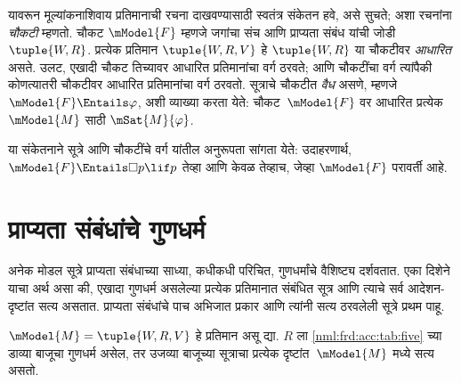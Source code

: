 यावरून मूल्यांकनाशिवाय प्रतिमानाची रचना दाखवण्यासाठी
स्वतंत्र संकेतन हवे, असे सुचते; अशा रचनांना \emph{चौकटी}
म्हणतो. चौकट $\mModel{F}$ म्हणजे जगांचा संच आणि
प्राप्यता संबंध यांची जोडी $\tuple{W, R}$.
प्रत्येक प्रतिमान $\tuple{W, R, V}$ हे $\tuple{W, R}$
या चौकटीवर \emph{आधारित} असते. उलट, एखादी चौकट
तिच्यावर आधारित प्रतिमानांचा वर्ग ठरवते; आणि चौकटींचा
वर्ग त्यांपैकी कोणत्यातरी चौकटीवर आधारित प्रतिमानांचा
वर्ग ठरवतो. सूत्राचे चौकटीत \emph{वैध} असणे,
म्हणजे $\mModel{F} \Entails \varphi$, अशी व्याख्या करता येते:
चौकट~$\mModel{F}$ वर आधारित प्रत्येक $\mModel{M}$
साठी $\mSat{M}{\varphi}$.

या संकेतनाने सूत्रे आणि चौकटींचे वर्ग यांतील
अनुरूपता सांगता येते: उदाहरणार्थ,
$\mModel{F} \Entails \Box p \lif p$ तेव्हा आणि केवळ
तेव्हाच, जेव्हा $\mModel{F}$ परावर्ती आहे.













\section{प्राप्यता संबंधांचे गुणधर्म}\label{nml:frd:acc:sec}

अनेक मोडल सूत्रे प्राप्यता संबंधाच्या साध्या, कधीकधी
परिचित, गुणधर्मांचे वैशिष्ट्य दर्शवतात. एका दिशेने याचा
अर्थ असा की, एखादा गुणधर्म असलेल्या प्रत्येक प्रतिमानात
संबंधित सूत्र आणि त्याचे सर्व आदेशन-दृष्टांत सत्य
असतात. प्राप्यता संबंधांचे पाच अभिजात प्रकार आणि त्यांनी
सत्य ठरवलेली सूत्रे प्रथम पाहू.

\begin{thm}\label{nml:frd:acc:thm:soundschemas}
  $\mModel{M} = \tuple{W, R, V}$ हे प्रतिमान असू द्या.
  $R$ ला \ref{nml:frd:acc:tab:five} च्या डाव्या बाजूचा गुणधर्म
  असेल, तर उजव्या बाजूच्या सूत्राचा प्रत्येक
  दृष्टांत~$\mModel{M}$ मध्ये सत्य असतो.
\end{thm}

